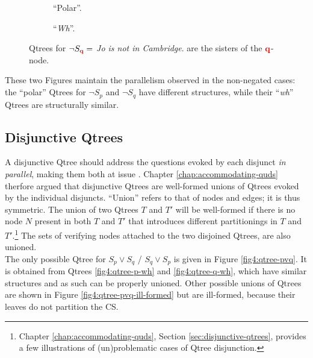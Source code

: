 	\setlength{\fboxsep}{2pt}
	\begin{figure}[H]
		\centering
		\begin{subfigure}[b]{.45\linewidth}
			\centering
			\caption[]{``Polar''.}\label{fig4:qtree-nq-polar}
		\end{subfigure}\hfill
		\begin{subfigure}[b]{.45\linewidth}
			\centering
			\scalebox{1}{
				\begin{forest}
					[CS [\fbox{$\p$}][{$\q$}][\fbox{$\r$}][\fbox{...}]]
				\end{forest}
			}
			\caption[]{``\textit{Wh}''.}\label{fig4:qtree-nq-wh}
		\end{subfigure}
		\caption[]{Qtrees for $\neg S\protect_{\textbf{\textcolor{red}{q}}}=$ \textit{Jo is not in Cambridge}.  are the sisters of the $\q$-node.}
		\label{fig4:qtrees-nq}
	\end{figure}

These two Figures maintain the parallelism observed in the non-negated cases: the ``polar'' Qtrees for $\neg S_p$ and $\neg S_q$ have different structures, while their ``\textit{wh}'' Qtrees are structurally similar.

\subsection{Disjunctive Qtrees}\label{sec:disj-lfs}

A disjunctive Qtree should address the questions evoked by each disjunct \textit{in parallel}, making them both at issue \parencite{Simons2001,Zhang2022}. Chapter \ref{chap:accommodating-quds} therfore argued that disjunctive Qtrees are well-formed unions of Qtrees evoked by the individual disjuncts. ``Union'' refers to that of nodes and edges; it is thus symmetric. The union of two Qtrees $T$ and $T'$ will be well-formed if there is no node $N$ present in both $T$ and $T'$ that introduces different partitionings in $T$ and $T'$.\footnote{Chapter \ref{chap:accommodating-quds}, Section \ref{sec:disjunctive-qtrees}, provides a few illustrations of (un)problematic cases of Qtree disjunction.} The sets of verifying nodes attached to the two disjoined Qtrees, are also unioned. \\

The only possible Qtree for $S_p \vee S_q$ / $S_q \vee S_p$ is given in Figure \ref{fig4:qtree-pvq}. It is obtained from Qtrees \ref{fig4:qtree-p-wh} and \ref{fig4:qtree-q-wh}, which have similar structures and as such can be properly unioned. Other possible unions of Qtrees are shown in Figure \ref{fig4:qtree-pvq-ill-formed} but are ill-formed, because their leaves do not partition the CS. 


